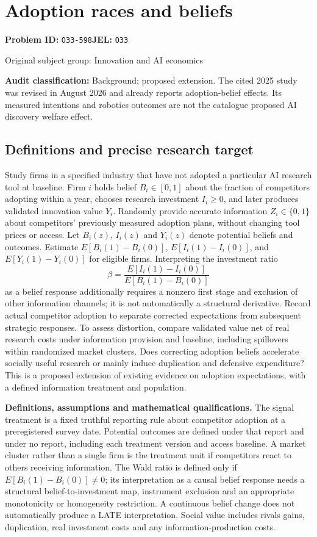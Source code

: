\documentclass[11pt,a4paper]{article}
\begin{document}
\section*{Adoption races and beliefs}
\textbf{Problem ID:} \texttt{O33-598}\quad \textbf{JEL:} \texttt{O33}\par
\label{problem:OP-0413}
{\sffamily\small\color{muted}Original subject group: Innovation and AI economics\par}
\label{definitions:problem:30007695}
\textbf{Audit classification:} Background; proposed extension. The cited 2025 study was revised in August 2026 and already reports adoption-belief effects. Its measured intentions and robotics outcomes are not the catalogue proposed AI discovery welfare effect.
\subsection*{Definitions and precise research target}
Study firms in a specified industry that have not adopted a particular AI research tool at baseline. Firm \(i\) holds belief \(B_i\in[0,1]\) about the fraction of competitors adopting within a year, chooses research investment \(I_i\geq0\), and later produces validated innovation value \(Y_i\). Randomly provide accurate information \(Z_i\in\{0,1\}\) about competitors' previously measured adoption plans, without changing tool prices or access. Let \(B_i(z)\), \(I_i(z)\) and \(Y_i(z)\) denote potential beliefs and outcomes. Estimate \(E[B_i(1)-B_i(0)]\), \(E[I_i(1)-I_i(0)]\), and \(E[Y_i(1)-Y_i(0)]\) for eligible firms. Interpreting the investment ratio
\[
\beta=\frac{E[I_i(1)-I_i(0)]}{E[B_i(1)-B_i(0)]}
\]
as a belief response additionally requires a nonzero first stage and exclusion of other information channels; it is not automatically a structural derivative. Record actual competitor adoption to separate corrected expectations from subsequent strategic responses. To assess distortion, compare validated value net of real research costs under information provision and baseline, including spillovers within randomized market clusters. Does correcting adoption beliefs accelerate socially useful research or mainly induce duplication and defensive expenditure? This is a proposed extension of existing evidence on adoption expectations, with a defined information treatment and population.

\textbf{Definitions, assumptions and mathematical qualifications.} The signal treatment is a fixed truthful reporting rule about competitor adoption at a preregistered survey date. Potential outcomes are defined under that report and under no report, including each treatment version and access baseline. A market cluster rather than a single firm is the treatment unit if competitors react to others receiving information. The Wald ratio is defined only if \(E[B_i(1)-B_i(0)]\ne0\); its interpretation as a causal belief response needs a structural belief-to-investment map, instrument exclusion and an appropriate monotonicity or homogeneity restriction. A continuous belief change does not automatically produce a LATE interpretation. Social value includes rivals gains, duplication, real investment costs and any information-production costs.
\end{document}
